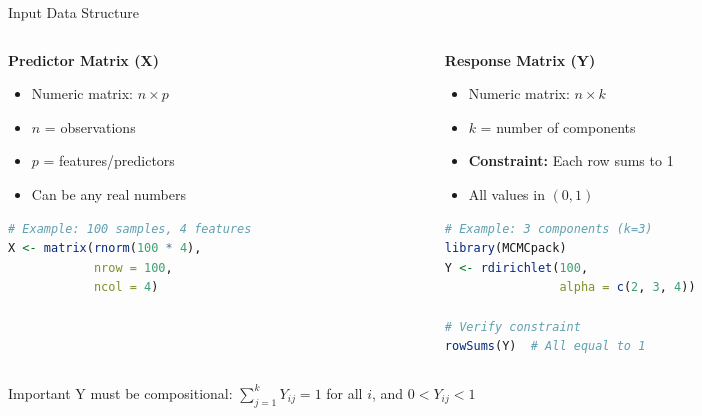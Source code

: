\documentclass[aspectratio=169]{beamer}
\begin{document}
\begin{frame}[fragile]{Input Data Structure}

\begin{columns}[T]

\begin{column}{0.48\textwidth}
\textbf{Predictor Matrix (X)}

\begin{itemize}
\item Numeric matrix: $n \times p$
\item $n$ = observations
\item $p$ = features/predictors
\item Can be any real numbers
\end{itemize}

\vspace{0.2cm}

\begin{lstlisting}[language=R, basicstyle=\tiny\ttfamily]
# Example: 100 samples, 4 features
X <- matrix(rnorm(100 * 4), 
            nrow = 100, 
            ncol = 4)
\end{lstlisting}

\end{column}

\begin{column}{0.48\textwidth}
\textbf{Response Matrix (Y)}

\begin{itemize}
\item Numeric matrix: $n \times k$
\item $k$ = number of components
\item \textbf{Constraint:} Each row sums to 1
\item All values in $(0, 1)$
\end{itemize}

\vspace{0.2cm}

\begin{lstlisting}[language=R, basicstyle=\tiny\ttfamily]
# Example: 3 components (k=3)
library(MCMCpack)
Y <- rdirichlet(100, 
                alpha = c(2, 3, 4))

# Verify constraint
rowSums(Y)  # All equal to 1
\end{lstlisting}

\end{column}

\end{columns}

\vspace{0.4cm}

\begin{alertblock}{Important}
Y must be compositional: $\sum_{j=1}^{k} Y_{ij} = 1$ for all $i$, and $0 < Y_{ij} < 1$
\end{alertblock}

\end{frame}
\end{document}
